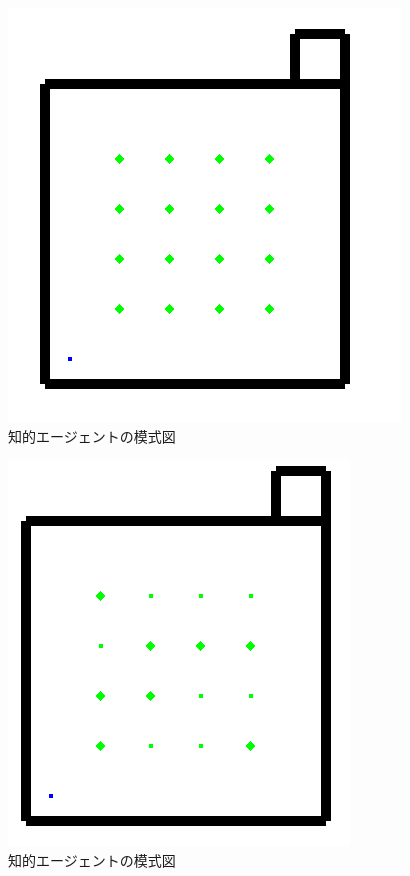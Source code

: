 \begin{figure}[htb]
\begin{center}
 \includegraphics[scale=0.6]{figures/elderly_v3.png}
 \caption[知的エージェントの模式図]{知的エージェントの模式図 \label{elderly_v3}}
\end{center}
\end{figure}

\begin{figure}[htb]
\begin{center}
 \includegraphics[scale=0.6]{figures/health_urinate.png}
 \caption[知的エージェントの模式図]{知的エージェントの模式図 \label{health_urinate}}
\end{center}
\end{figure}

